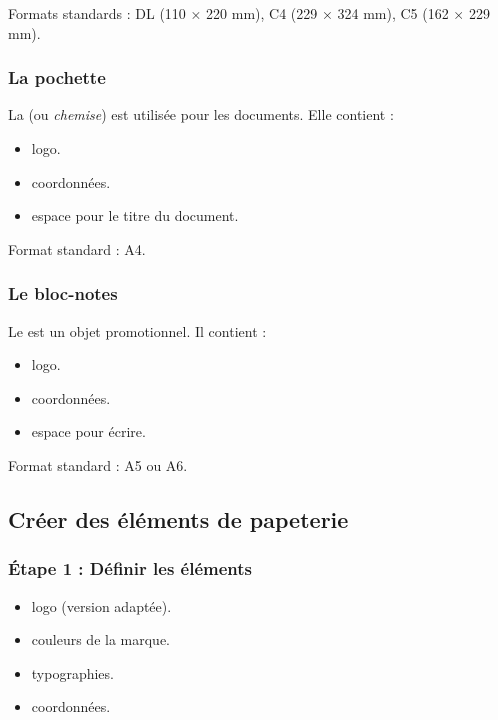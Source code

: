 Formats standards : DL (110 × 220 mm), C4 (229 × 324 mm), C5 (162 × 229 mm).

\subsubsection{La pochette}

La  (ou \emph{chemise}) est utilisée pour les documents. Elle contient :

\begin{itemize}
    \item {} logo.
    \item {} coordonnées.
    \item {} espace pour le titre du document.
\end{itemize}

Format standard : A4.

\subsubsection{Le bloc-notes}

Le  est un objet promotionnel. Il contient :

\begin{itemize}
    \item {} logo.
    \item {} coordonnées.
    \item {} espace pour écrire.
\end{itemize}

Format standard : A5 ou A6.

\subsection{Créer des éléments de papeterie}

\subsubsection{Étape 1 : Définir les éléments}

\begin{itemize}
    \item {} logo (version adaptée).
    \item {} couleurs de la marque.
    \item {} typographies.
    \item {} coordonnées.
\end{itemize}

